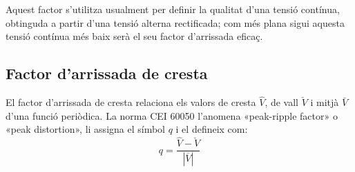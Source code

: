 Aquest factor s'utilitza usualment per definir la qualitat d'una
tensió contínua, obtinguda a partir  d'una tensió alterna rectificada; com més
plana sigui aquesta tensió contínua més baix serà el seu factor
d'arrissada eficaç.

\subsection{Factor d'arrissada de cresta}

El factor d'arrissada de cresta relaciona els valors de cresta $\hat{V}$, de vall $\check{V}$  i mitjà $\bar{V}$
 d'una funció periòdica. La norma CEI 60050 l'anomena «peak-ripple factor» o «peak distortion», li assigna el símbol $q$ i el defineix com:
\begin{equation}
    q = \frac{\hat{V} - \check{V}}{|\bar{V}|}
\end{equation}


